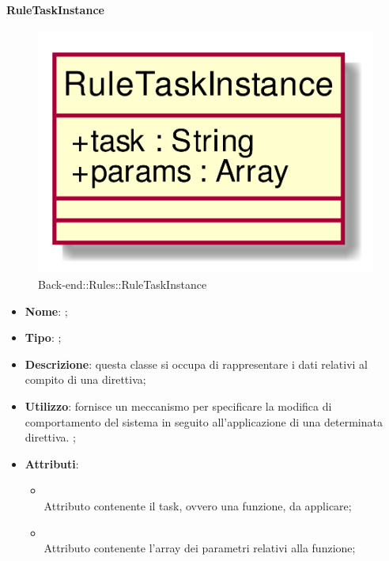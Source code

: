 \hypertarget{RuleTaskInstance_label}{\paragraph{RuleTaskInstance}}
\begin{figure}[h]
	\centering
	\includegraphics[width=\textwidth,height=\textheight,keepaspectratio]{images/ClassRuleTaskInstance.png}
	\caption{Back-end::Rules::RuleTaskInstance}
\end{figure}
\begin{itemize}
	\item \textbf{Nome}: ;
	\item \textbf{Tipo}: ;
	\item \textbf{Descrizione}: questa classe si occupa di rappresentare i dati relativi al compito di una direttiva;
	\item \textbf{Utilizzo}: fornisce un meccanismo per specificare la modifica di comportamento del sistema in seguito all'applicazione di una determinata direttiva. ;
	\item \textbf{Attributi}:
	\begin{itemize}
		\item[]  \\
		Attributo contenente il task, ovvero una funzione, da applicare;
		\item[]  \\
		Attributo contenente l'array dei parametri relativi alla funzione;
	\end{itemize}
\end{itemize}
\FloatBarrier

